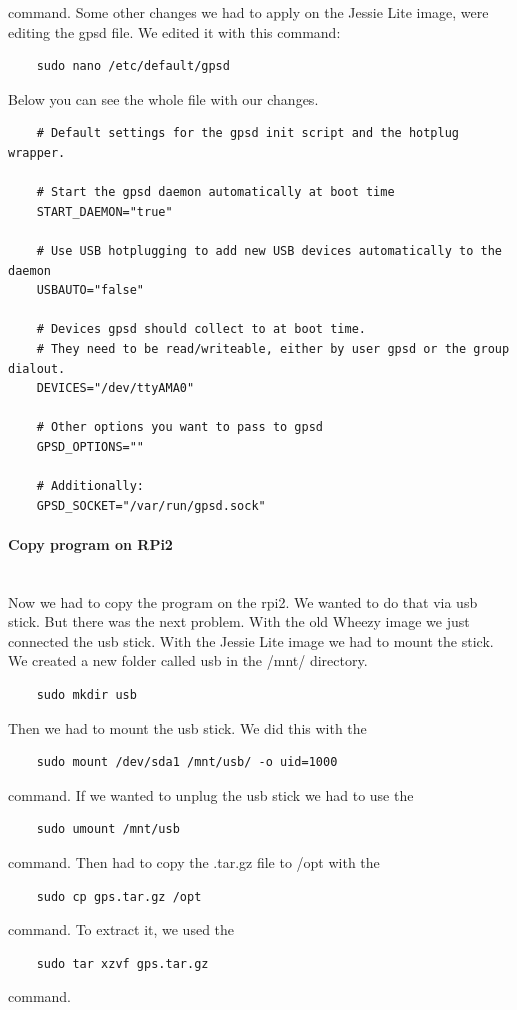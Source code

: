 command.\newline
Some other changes we had to apply on the Jessie Lite image, were editing the \gls{gpsd} file. We edited it with this command:
\begin{verbatim}
	sudo nano /etc/default/gpsd
\end{verbatim}
Below you can see the whole file with our changes. 
\begin{verbatim}
	# Default settings for the gpsd init script and the hotplug wrapper.

	# Start the gpsd daemon automatically at boot time
	START_DAEMON="true"

	# Use USB hotplugging to add new USB devices automatically to the daemon
	USBAUTO="false"

	# Devices gpsd should collect to at boot time.
	# They need to be read/writeable, either by user gpsd or the group dialout.
	DEVICES="/dev/ttyAMA0"

	# Other options you want to pass to gpsd
	GPSD_OPTIONS=""

	# Additionally:
	GPSD_SOCKET="/var/run/gpsd.sock"
\end{verbatim}
\paragraph{Copy program on RPi2} \mbox{}\\
Now we had to copy the program on the \gls{rpi2}. We wanted to do that via \gls{usb} stick. But there was the next problem. With the old Wheezy image we just connected the \gls{usb} stick. With the Jessie Lite image we had to mount the stick. We created a new folder called usb in the /mnt/ directory.
\begin{verbatim}
	sudo mkdir usb
\end{verbatim}
Then we had to mount the \gls{usb} stick. We did this with the
\begin{verbatim}
	sudo mount /dev/sda1 /mnt/usb/ -o uid=1000
\end{verbatim}
command. If we wanted to unplug the \gls{usb} stick we had to use the 
\begin{verbatim}
	sudo umount /mnt/usb
\end{verbatim}
command.\newline
Then had to copy the .tar.gz file to /opt with the \begin{verbatim}
	sudo cp gps.tar.gz /opt
\end{verbatim}
command. To extract it, we used the 
\begin{verbatim}
	sudo tar xzvf gps.tar.gz
\end{verbatim}
command.\newline

